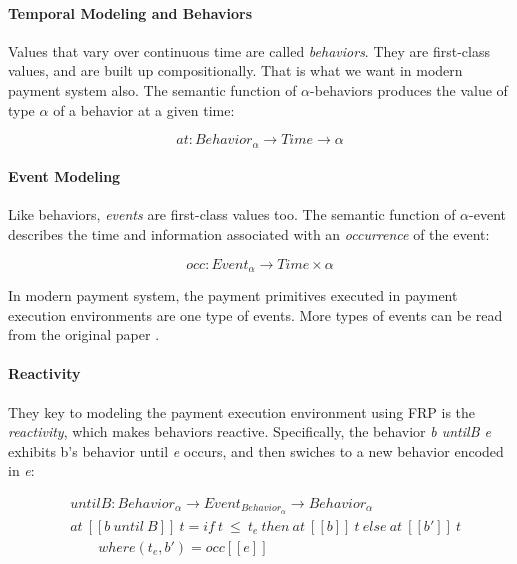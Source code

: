 \paragraph{Temporal Modeling and Behaviors}

Values that vary over continuous time are called \textit{behaviors}. They are first-class values,
and are built up compositionally. That is what we want in modern payment system also. The semantic
function of $\alpha$-behaviors produces the value of type $\alpha$ of a behavior at a given time:

\begin{equation}
    at : Behavior_{\alpha} \rightarrow Time \rightarrow \alpha
\end{equation}

\paragraph{Event Modeling}

Like behaviors, \textit{events} are first-class values too. The semantic function of $\alpha$-event
describes the time and information associated with an \textit{occurrence} of the event:

\begin{equation}
    occ : Event_{\alpha} \rightarrow Time \times \alpha
\end{equation}

In modern payment system, the payment primitives executed in payment execution environments are
one type of events. More types of events can be read from the original paper .

\paragraph{Reactivity}

They key to modeling the payment execution environment using FRP is the \textit{reactivity}, which
makes behaviors reactive. Specifically, the behavior \textit{b untilB e} exhibits b's behavior
until \textit{e} occurs, and then swiches to a new behavior encoded in \textit{e}:

\begin{equation}
    \begin{split}
    &untilB : Behavior_{\alpha} \rightarrow Event_{Behavior_{\alpha}} \rightarrow Behavior_{\alpha} \\
    &at\ [\![b\ until\ B]\!]\ t = if\ t\ \leq\ t_{e}\ then\ at\ [\![b]\!]\ t\ else\ at\ [\![b']\!]\ t \\
    &\qquad where (t_e, b') = occ[\![e]\!]
    \end{split}
\end{equation}

